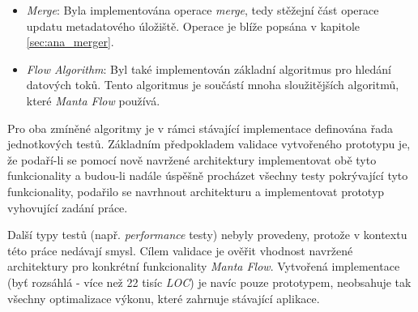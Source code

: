 \begin{itemize}
   \item{\textit{Merge}}: Byla implementována operace \textit{merge}, tedy stěžejní část operace updatu metadatového úložiště. Operace je blíže popsána v kapitole \ref{sec:ana_merger}.
   \item{\textit{Flow Algorithm}}: Byl také implementován základní algoritmus pro hledání datových toků. Tento algoritmus je součástí mnoha sloužitějších algoritmů, které \textit{Manta Flow} používá.
\end{itemize}

Pro oba zmíněné algoritmy je v rámci stávající implementace definována řada jednotkových testů. Základním předpokladem validace vytvořeného prototypu je, že podaří-li se pomocí nově navržené architektury implementovat obě tyto funkcionality a budou-li nadále úspěšně procházet všechny testy pokrývající tyto funkcionality, podařilo se navrhnout architekturu a implementovat prototyp vyhovující zadání práce.


Další typy testů (např. \textit{performance} testy) nebyly provedeny, protože v kontextu této práce nedávají smysl. Cílem validace je ověřit vhodnost navržené architektury pro konkrétní funkcionality \textit{Manta Flow}. Vytvořená implementace (byť rozsáhlá - více než 22 tisíc \textit{LOC}) je navíc pouze prototypem, neobsahuje tak všechny optimalizace výkonu, které zahrnuje stávající aplikace.
